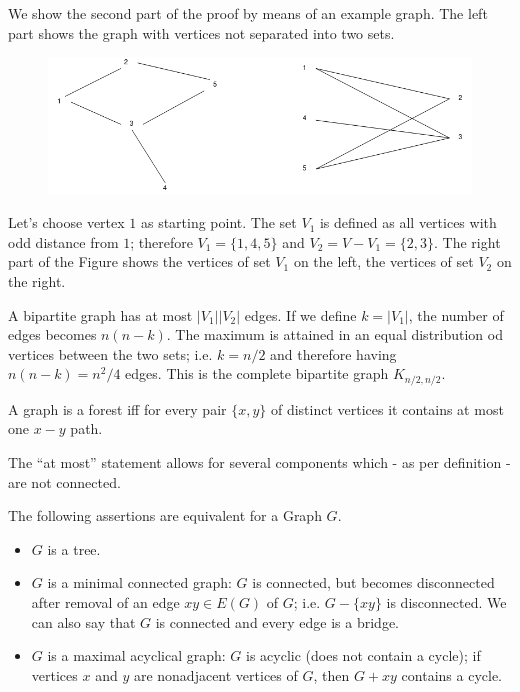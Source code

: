 We show the second part of the proof by means of an example graph. The left part shows the graph with vertices not separated into two sets.

  \begin{figure}[H]
    \centering
    \includegraphics[scale=0.5]{images/graphs_03_05.png}
  \end{figure}

Let's choose vertex $1$ as starting point. The set $V_1$ is defined as all vertices with odd distance from $1$; therefore $V_1 = \{1, 4, 5\}$ and $V_2 = V - V_1 = \{2, 3\}$. The right part of the Figure shows the vertices of set $V_1$ on the left, the vertices of set $V_2$ on the right.

A bipartite graph has at most $|V_1| |V_2|$ edges. If we define $k = |V_1|$, the number of edges becomes $n(n-k)$. The maximum is attained in an equal distribution od vertices between the two sets; i.e. $k = n/2$ and therefore having $n(n-k) = n^2/4$ edges. This is the complete bipartite graph $K_{n/2, n/2}$.
  
\begin{theorem}
  A graph is a forest iff for every pair $\{x,y\}$ of distinct vertices it contains at most one $x-y$ path.
\end{theorem}

The ``at most'' statement allows for several components which - as per definition - are not connected.

\begin{theorem}
  The following assertions are equivalent for a Graph $G$.
  \begin{itemize}
  \item $G$ is a tree.
  \item $G$ is a minimal connected graph: $G$ is connected, but becomes disconnected after removal of an edge $xy \in E(G)$ of $G$; i.e. $G - \{xy\}$ is disconnected. We can also say that $G$ is connected and every edge is a bridge.
  \item $G$ is a maximal acyclical graph: $G$ is acyclic (does not contain a cycle); if vertices $x$ and $y$ are nonadjacent vertices of $G$, then $G + xy$ contains a cycle.
  \end{itemize}
\end{theorem}


